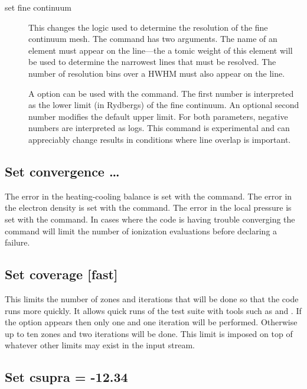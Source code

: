\begin{description}
\item[set fine continuum]  This changes the logic used
to determine the
resolution of the fine continuum mesh.
The command has two arguments.
The name of an element must appear on the line---the a
tomic weight of this
element will be used to determine the narrowest lines
that must be resolved.
The number of resolution bins over a HWHM must also
appear on the line.

\begin{shaded}
A  option can be used with the
 command.  The first number is
interpreted as the lower limit (in Rydbergs) of the fine continuum.
An optional second number modifies the default upper limit.  For both
parameters, negative numbers are interpreted as logs.
This command is experimental
and can appreciably change results in conditions where line overlap
is important.
\end{shaded}

\end{description}

\subsection{Set convergence \dots}

The error in the heating-cooling balance is set
with the  command.
The error in the electron
density is set with the  command.
The error in the local pressure is set with the
 command.
In cases where the code
is having trouble converging the  command
will limit the number of ionization evaluations before declaring
a failure.

\subsection{Set coverage [fast]}

This limits the number of zones and iterations that will be done so that
the code runs more quickly.
It allows quick runs of the test suite with
tools such as  and .
If the  option appears then only
one and one iteration will be performed.
Otherwise up to ten zones and
two iterations will be done.
This limit is imposed on top of whatever other
limits may exist in the input stream.

\subsection{Set csupra = -12.34}

